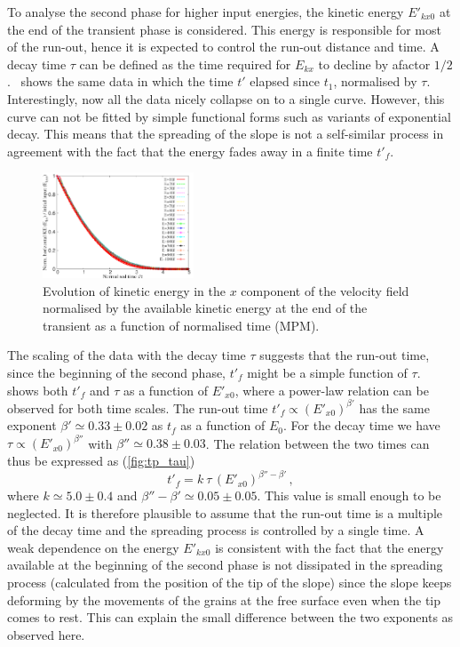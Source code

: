 \documentclass[3p,times,procedia,number]{elsarticle}
\begin{document}
To analyse the second phase for higher input energies, the kinetic energy
$E'_{kx0}$ at the end of the transient phase is considered. This energy is
responsible for most of the run-out, hence it is expected to control the
run-out distance and time. A decay time $\tau$ can be defined as the time
required for $E_{kx}$ to decline by afactor $1/2$.~
shows the same data in which the time $t'$ elapsed since $t_1$, normalised by
$\tau$. Interestingly, now all the data nicely collapse on to a single curve.
However, this curve can not be fitted by simple functional forms such as
variants of exponential decay. This means that the spreading of the slope is not
a self-similar process in agreement with the fact that the energy fades away in
a finite time $t'_f$. 

\begin{figure}[tbhp]
  \centering
  \includegraphics[width=0.4\textwidth]{figs/EkxKoTTau_Slope}
  \caption[Evolution of the normalised horizontal kinetic energy as function of 
  the normalised time since the transient phase.]{Evolution of kinetic energy in 
  the $x$ component of the velocity field  normalised by the available kinetic
  energy at the end of the transient as a function of normalised time (MPM).}
  \label{fig:ExEx0_vs_ttau}
\end{figure}


The scaling of the data with the decay time $\tau$ suggests that the 
run-out time, since the beginning of the second phase, $t'_f$ might be a simple 
function of $\tau$.~ shows both $t'_f$ and $\tau$ as 
a function of $E'_{x0}$, where a power-law relation can be observed for both 
time scales. The run-out time $t'_f \propto (E'_{x0})^{\beta'}$ has the 
same exponent $\beta' \simeq 0.33 \pm 0.02$ as $t_f$ as a function of $E_0$. 
For the decay time we have $\tau \propto (E'_{x0})^{\beta''}$ with $\beta'' 
\simeq 0.38 \pm 0.03$. The relation between the two times can thus be expressed 
as (\cref{fig:tp_tau})
\begin{equation}
  t'_f = k  \ \tau \, (E'_{x0})^{\beta'' - \beta'} \,,
  \label{eqn:t'f}
\end{equation}
where $k \simeq 5.0 \pm 0.4$ and $\beta'' - \beta' \simeq 0.05 \pm 0.05$. This 
value is small enough to be neglected. It is therefore plausible to assume that 
the run-out time is a multiple of the decay time and the spreading process is 
controlled by a single time. A weak dependence on the energy $E'_{kx0}$ is 
consistent with the fact that the energy available at the beginning of the 
second phase is not dissipated in the spreading process (calculated from the 
position of the tip of the slope) since the slope keeps deforming by the 
movements of the grains at the free surface even when the tip comes to rest. 
This can explain the small difference between the two exponents as observed 
here.
\end{document}
